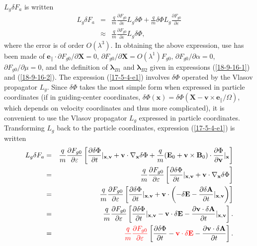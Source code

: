 \documentclass{llncs}
\newcommand{\nobracket}{}
\newcommand{\tmcolor}[2]{{\color{#1}{#2}}}
\newcommand{\tmmathbf}[1]{\ensuremath{\boldsymbol{#1}}}
\begin{document}
$L_g \delta F_a$ is written
\begin{eqnarray}
  L_g \delta F_a & = & \frac{q}{m}  \frac{\partial F_{g 0}}{\partial
  \varepsilon} L_g \delta \Phi + \frac{q}{m} \delta \Phi L_g \frac{\partial
  F_{g 0}}{\partial \varepsilon} \nonumber\\
  & \approx & \frac{q}{m}  \frac{\partial F_{g 0}}{\partial \varepsilon} L_g
  \delta \Phi,  \label{17-5-4-e1}
\end{eqnarray}
where the error is of order $O (\lambda^3)$. In obtaining the above
expression, use has been made of $\mathbf{e}_{\parallel} \cdot \partial F_{g
0} / \partial \mathbf{X}= 0$, $\partial F_{g 0} / \partial \mathbf{X}= O
(\lambda^1) F_{g 0}$, $\partial F_{g 0} / \partial \alpha = 0$, $\partial F_{g
0} / \partial \mu = 0$, and the definition of $\tmmathbf{\lambda}_{B 1}$ and
$\tmmathbf{\lambda}_{B 2}$ given in expressions (\ref{18-9-16-1}) and
(\ref{18-9-16-2}). The expression (\ref{17-5-4-e1}) involves $\delta \Phi$
operated by the Vlasov propagator $L_g$. Since $\delta \Phi$ takes the most
simple form when expressed in particle coordinates (if in guiding-center
coordinates, $\delta \Phi (\mathbf{x}) = \delta \Phi (\mathbf{X}-\mathbf{v}
\times \mathbf{e}_{\parallel} / \Omega)$, which depends on velocity
coordinates and thus more complicated), it is convenient to use the Vlasov
propagator $L_g$ expressed in particle coordinates. Transforming $L_g$ back to
the particle coordinates, expression (\ref{17-5-4-e1}) is written
\begin{eqnarray}
  L_g \delta F_a & = & \frac{q}{m}  \frac{\partial F_{g 0}}{\partial
  \varepsilon} \left[ \frac{\partial \delta \Phi}{\partial t} |_{\mathbf{x},
  \mathbf{v}} \nobracket +\mathbf{v} \cdot \nabla_{\mathbf{x}} \delta \Phi +
  \frac{q}{m} (\mathbf{E}_0 +\mathbf{v} \times \mathbf{B}_0) \cdot
  \frac{\partial \Phi}{\partial \mathbf{v}} |_{\mathbf{x}} \right] \nonumber\\
  & = & \frac{q}{m}  \frac{\partial F_{g 0}}{\partial \varepsilon} \left[
  \frac{\partial \delta \Phi}{\partial t} |_{\mathbf{x}, \mathbf{v}}
  \nobracket +\mathbf{v} \cdot \nabla_{\mathbf{x}} \delta \Phi \right] \\
  & = & \frac{q}{m}  \frac{\partial F_{g 0}}{\partial \varepsilon} \left[
  \frac{\partial \delta \Phi}{\partial t} |_{\mathbf{x}, \mathbf{v}}
  \nobracket +\mathbf{v} \cdot \left( - \delta \mathbf{E}- \frac{\partial
  \delta \mathbf{A}}{\partial t} |_{\mathbf{x}, \mathbf{v}} \nobracket \right)
  \right] \nonumber\\
  & = & \frac{q}{m}  \frac{\partial F_{g 0}}{\partial \varepsilon} \left[
  \frac{\partial \delta \Phi}{\partial t} |_{\mathbf{x}, \mathbf{v}}
  \nobracket -\mathbf{v} \cdot \delta \mathbf{E}- \frac{\partial \mathbf{v}
  \cdot \delta \mathbf{A}}{\partial t} |_{\mathbf{x}, \mathbf{v}} \nobracket
  \right] . \\
  & = & \tmcolor{red}{\frac{q}{m}  \frac{\partial F_{g 0}}{\partial
  \varepsilon}} \left[ \frac{\partial \delta \Phi}{\partial t} -
  \tmcolor{red}{\mathbf{v} \cdot \delta \mathbf{E}} - \frac{\partial
  \mathbf{v} \cdot \delta \mathbf{A}}{\partial t} \right] . 
\end{eqnarray}
\end{document}
